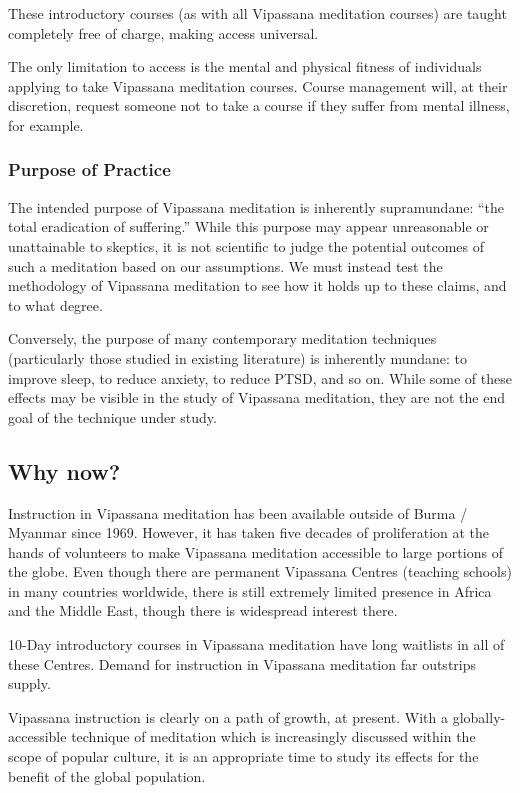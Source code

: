 \documentclass[a4paper, amsfonts, amssymb, amsmath, reprint, showkeys, nofootinbib, twoside]{revtex4-1}
\begin{document}
These introductory courses (as with all Vipassana meditation courses)
are taught completely free of charge, making access universal.

The only limitation to access is the mental and physical fitness of
individuals applying to take Vipassana meditation courses.
Course management will, at their discretion, request someone not to
take a course if they suffer from mental illness, for example.

\subsubsection{Purpose of Practice}

The intended purpose of Vipassana meditation is inherently supramundane:
``the total eradication of suffering.''
While this purpose may appear unreasonable or unattainable to skeptics,
it is not scientific to judge the potential outcomes of such a meditation
based on our assumptions.
We must instead test the methodology of Vipassana meditation to see
how it holds up to these claims, and to what degree.

Conversely, the purpose of many contemporary meditation techniques
(particularly those studied in existing literature) is inherently mundane:
to improve sleep, to reduce anxiety, to reduce PTSD, and so on.
While some of these effects may be visible in the study of Vipassana
meditation, they are not the end goal of the technique under study.

\subsection{Why now?}

Instruction in Vipassana meditation has been available outside of
Burma / Myanmar since 1969.
However, it has taken five decades of proliferation at the hands of
volunteers to make Vipassana meditation accessible to large portions of
the globe.
Even though there are permanent Vipassana Centres (teaching schools) in
many countries worldwide, there is still extremely limited presence in
Africa and the Middle East, though there is widespread interest there.

10-Day introductory courses in Vipassana meditation have long waitlists
in all of these Centres.
Demand for instruction in Vipassana meditation far outstrips supply.

Vipassana instruction is clearly on a path of growth, at present.
With a globally-accessible technique of meditation which is increasingly
discussed within the scope of popular culture, it is an appropriate
time to study its effects for the benefit of the global population.
\cite{marriage2024theretreat,muraskin2024perils,sacchet2024advanced}
\end{document}
